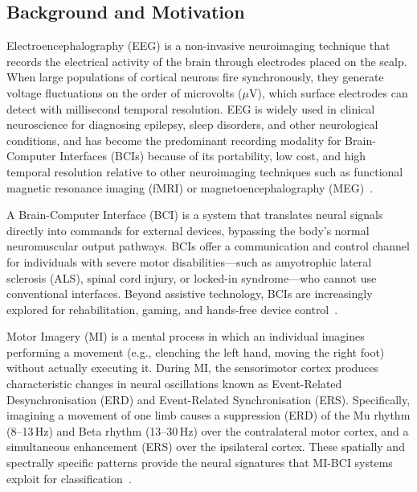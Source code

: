 \documentclass[12pt, a4paper]{article}
\begin{document}
\subsection{Background and Motivation}

Electroencephalography (EEG) is a non-invasive neuroimaging technique that records the electrical activity of the brain through electrodes placed on the scalp. When large populations of cortical neurons fire synchronously, they generate voltage fluctuations on the order of microvolts ($\mu$V), which surface electrodes can detect with millisecond temporal resolution. EEG is widely used in clinical neuroscience for diagnosing epilepsy, sleep disorders, and other neurological conditions, and has become the predominant recording modality for Brain-Computer Interfaces (BCIs) because of its portability, low cost, and high temporal resolution relative to other neuroimaging techniques such as functional magnetic resonance imaging (fMRI) or magnetoencephalography (MEG)~\cite{hameed2025enhancing}.

A Brain-Computer Interface (BCI) is a system that translates neural signals directly into commands for external devices, bypassing the body's normal neuromuscular output pathways. BCIs offer a communication and control channel for individuals with severe motor disabilities---such as amyotrophic lateral sclerosis (ALS), spinal cord injury, or locked-in syndrome---who cannot use conventional interfaces. Beyond assistive technology, BCIs are increasingly explored for rehabilitation, gaming, and hands-free device control~\cite{jeong2020multimodal}.

Motor Imagery (MI) is a mental process in which an individual imagines performing a movement (e.g., clenching the left hand, moving the right foot) without actually executing it. During MI, the sensorimotor cortex produces characteristic changes in neural oscillations known as Event-Related Desynchronisation (ERD) and Event-Related Synchronisation (ERS). Specifically, imagining a movement of one limb causes a suppression (ERD) of the Mu rhythm (8--13\,Hz) and Beta rhythm (13--30\,Hz) over the contralateral motor cortex, and a simultaneous enhancement (ERS) over the ipsilateral cortex. These spatially and spectrally specific patterns provide the neural signatures that MI-BCI systems exploit for classification~\cite{hameed2025enhancing}.
\end{document}
